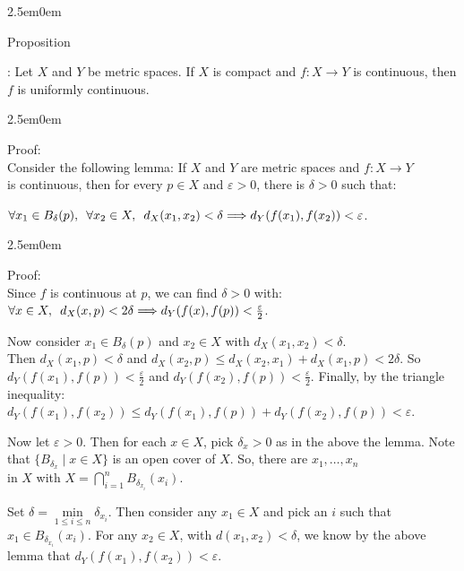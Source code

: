 \documentclass{book}
\newcommand{\hTwo}{%
   \color{MidnightBlue}%
   \fontsize{13}{15}\selectfont%
}
\newcommand{\hThree}{%
   \color{PineGreen}
   \fontsize{13}{15}\selectfont%
}
\newcommand{\hFour}{%
   \color{Cerulean}
   \fontsize{12}{14}\selectfont%
}
\newenvironment{myIndent}{%
   \begin{adjustwidth}{2.5em}{0em}%
}{%
   \end{adjustwidth}%
}
\newcommand{\retTwo}{\hfill\bigbreak}
\newcommand{\myHS}{ \hspace{0.5em}}
\newcounter{PropNumber}
\newcommand{\propCount}[1][1]{%
   \addtocounter{PropNumber}{#1}%
   \thePropNumber%
}
\begin{document}
   {\begin{myIndent} \hTwo
      Proposition \propCount: Let $X$ and $Y$ be metric spaces. If $X$ is compact and $f: X \rightarrow Y$ is continuous, then $f$ is uniformly continuous.
      
      {\begin{myIndent} \hThree
         Proof:\\
         Consider the following lemma: If $X$ and $Y$ are metric spaces and $f: X \rightarrow Y$\\ is continuous, then for every $p \in X$ and $\varepsilon > 0$, there is $\delta > 0$ such that:

         {\centering $ \forall x_1 \in B_\delta(p), \myHS \forall x_2 \in X, \myHS d_X(x_1, x_2) < \delta \Longrightarrow d_Y(f(x_1), f(x_2)) < \varepsilon$.\par}
         
         {\begin{myIndent} \hFour
            Proof:\\
            Since $f$ is continuous at $p$, we can find $\delta > 0$ with:\\ $\forall x \in X, \myHS d_X(x, p) < 2\delta \Longrightarrow d_Y(f(x), f(p)) < \frac{\varepsilon}{2}$.

            \newpage

            Now consider $x_1 \in B_\delta(p)$ and $x_2 \in X$ with $d_X(x_1, x_2) < \delta$.\\ Then $d_X(x_1, p) < \delta$ and $d_X(x_2, p) \leq d_X(x_2, x_1) + d_X(x_1, p) < 2\delta$. So $d_Y(f(x_1), f(p)) < \frac{\varepsilon}{2}$ and $d_Y(f(x_2), f(p)) < \frac{\varepsilon}{2}$. Finally, by the triangle\\ inequality:
            $ d_Y(f(x_1), f(x_2)) \leq d_Y(f(x_1), f(p)) + d_Y(f(x_2), f(p)) < \varepsilon$.\retTwo
         \end{myIndent}}

         Now let $\varepsilon > 0$. Then for each $x \in X$, pick $\delta_x > 0$ as in the above the lemma. Note that $\{B_{\delta_x} \mid x \in X\}$ is an open cover of $X$. So, there are $x_1, \ldots, x_n$\\ in $X$ with $X = {\displaystyle \bigcap_{i=1}^n}{B_{\delta_{x_i}}(x_i)}$. \retTwo

         Set $\delta = \min\limits_{1 \leq i \leq n}\delta_{x_i}$. Then consider any $x_1 \in X$ and pick an $i$ such that\\ $x_1 \in B_{\delta_{x_i}}(x_i)$. For any $x_2 \in X$, with $d(x_1, x_2) < \delta$, we know by the above\\ [6pt] lemma that $d_Y(f(x_1), f(x_2)) < \varepsilon$. \retTwo
      \end{myIndent}}
   \end{myIndent}}
\end{document}
